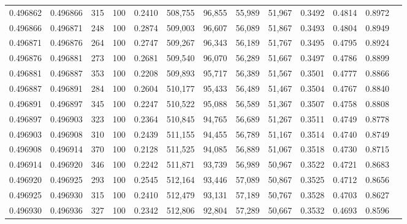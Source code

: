 \begin{tabular}{rrrrrrrrrrrrr}
0.496862 & 0.496866 &   315 & 100 &                                     0.2410 & 508,755 &  96,855 &  55,989 &  51,967 & 0.3492 & 0.4814 & 0.8972 \\
0.496866 & 0.496871 &   248 & 100 &                                     0.2874 & 509,003 &  96,607 &  56,089 &  51,867 & 0.3493 & 0.4804 & 0.8949 \\
0.496871 & 0.496876 &   264 & 100 &                                     0.2747 & 509,267 &  96,343 &  56,189 &  51,767 & 0.3495 & 0.4795 & 0.8924 \\
0.496876 & 0.496881 &   273 & 100 &                                     0.2681 & 509,540 &  96,070 &  56,289 &  51,667 & 0.3497 & 0.4786 & 0.8899 \\
0.496881 & 0.496887 &   353 & 100 &                                     0.2208 & 509,893 &  95,717 &  56,389 &  51,567 & 0.3501 & 0.4777 & 0.8866 \\
0.496887 & 0.496891 &   284 & 100 &                                     0.2604 & 510,177 &  95,433 &  56,489 &  51,467 & 0.3504 & 0.4767 & 0.8840 \\
0.496891 & 0.496897 &   345 & 100 &                                     0.2247 & 510,522 &  95,088 &  56,589 &  51,367 & 0.3507 & 0.4758 & 0.8808 \\
0.496897 & 0.496903 &   323 & 100 &                                     0.2364 & 510,845 &  94,765 &  56,689 &  51,267 & 0.3511 & 0.4749 & 0.8778 \\
0.496903 & 0.496908 &   310 & 100 &                                     0.2439 & 511,155 &  94,455 &  56,789 &  51,167 & 0.3514 & 0.4740 & 0.8749 \\
0.496908 & 0.496914 &   370 & 100 &                                     0.2128 & 511,525 &  94,085 &  56,889 &  51,067 & 0.3518 & 0.4730 & 0.8715 \\
0.496914 & 0.496920 &   346 & 100 &                                     0.2242 & 511,871 &  93,739 &  56,989 &  50,967 & 0.3522 & 0.4721 & 0.8683 \\
0.496920 & 0.496925 &   293 & 100 &                                     0.2545 & 512,164 &  93,446 &  57,089 &  50,867 & 0.3525 & 0.4712 & 0.8656 \\
0.496925 & 0.496930 &   315 & 100 &                                     0.2410 & 512,479 &  93,131 &  57,189 &  50,767 & 0.3528 & 0.4703 & 0.8627 \\
0.496930 & 0.496936 &   327 & 100 &                                     0.2342 & 512,806 &  92,804 &  57,289 &  50,667 & 0.3532 & 0.4693 & 0.8596 \\

\end{tabular}
